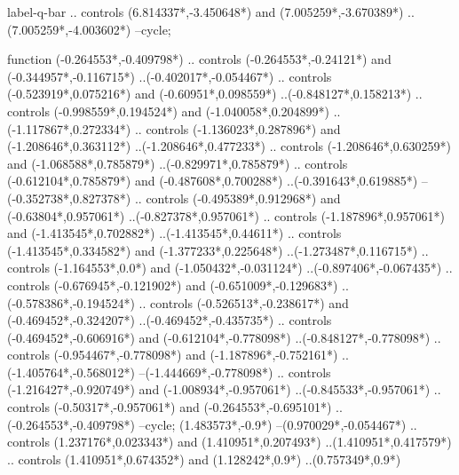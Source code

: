 {\begin{scope}[x=1mm,y=1mm,line width=\SCstroke mm,line cap=round,line join=round]
\begin{SCpart}{label-q-bar}
.. controls ({6.814337*\SCF},{-3.450648*\SCF}) and ({7.005259*\SCF},{-3.670389*\SCF}) ..({7.005259*\SCF},{-4.003602*\SCF})
--cycle;
\end{SCpart}
\begin{SCpart}{function}
 ({-0.264553*\SCF},{-0.409798*\SCF})
.. controls ({-0.264553*\SCF},{-0.24121*\SCF}) and ({-0.344957*\SCF},{-0.116715*\SCF}) ..({-0.402017*\SCF},{-0.054467*\SCF})
.. controls ({-0.523919*\SCF},{0.075216*\SCF}) and ({-0.60951*\SCF},{0.098559*\SCF}) ..({-0.848127*\SCF},{0.158213*\SCF})
.. controls ({-0.998559*\SCF},{0.194524*\SCF}) and ({-1.040058*\SCF},{0.204899*\SCF}) ..({-1.117867*\SCF},{0.272334*\SCF})
.. controls ({-1.136023*\SCF},{0.287896*\SCF}) and ({-1.208646*\SCF},{0.363112*\SCF}) ..({-1.208646*\SCF},{0.477233*\SCF})
.. controls ({-1.208646*\SCF},{0.630259*\SCF}) and ({-1.068588*\SCF},{0.785879*\SCF}) ..({-0.829971*\SCF},{0.785879*\SCF})
.. controls ({-0.612104*\SCF},{0.785879*\SCF}) and ({-0.487608*\SCF},{0.700288*\SCF}) ..({-0.391643*\SCF},{0.619885*\SCF})
--({-0.352738*\SCF},{0.827378*\SCF})
.. controls ({-0.495389*\SCF},{0.912968*\SCF}) and ({-0.63804*\SCF},{0.957061*\SCF}) ..({-0.827378*\SCF},{0.957061*\SCF})
.. controls ({-1.187896*\SCF},{0.957061*\SCF}) and ({-1.413545*\SCF},{0.702882*\SCF}) ..({-1.413545*\SCF},{0.44611*\SCF})
.. controls ({-1.413545*\SCF},{0.334582*\SCF}) and ({-1.377233*\SCF},{0.225648*\SCF}) ..({-1.273487*\SCF},{0.116715*\SCF})
.. controls ({-1.164553*\SCF},{0.0*\SCF}) and ({-1.050432*\SCF},{-0.031124*\SCF}) ..({-0.897406*\SCF},{-0.067435*\SCF})
.. controls ({-0.676945*\SCF},{-0.121902*\SCF}) and ({-0.651009*\SCF},{-0.129683*\SCF}) ..({-0.578386*\SCF},{-0.194524*\SCF})
.. controls ({-0.526513*\SCF},{-0.238617*\SCF}) and ({-0.469452*\SCF},{-0.324207*\SCF}) ..({-0.469452*\SCF},{-0.435735*\SCF})
.. controls ({-0.469452*\SCF},{-0.606916*\SCF}) and ({-0.612104*\SCF},{-0.778098*\SCF}) ..({-0.848127*\SCF},{-0.778098*\SCF})
.. controls ({-0.954467*\SCF},{-0.778098*\SCF}) and ({-1.187896*\SCF},{-0.752161*\SCF}) ..({-1.405764*\SCF},{-0.568012*\SCF})
--({-1.444669*\SCF},{-0.778098*\SCF})
.. controls ({-1.216427*\SCF},{-0.920749*\SCF}) and ({-1.008934*\SCF},{-0.957061*\SCF}) ..({-0.845533*\SCF},{-0.957061*\SCF})
.. controls ({-0.50317*\SCF},{-0.957061*\SCF}) and ({-0.264553*\SCF},{-0.695101*\SCF}) ..({-0.264553*\SCF},{-0.409798*\SCF})
--cycle;
 ({1.483573*\SCF},{-0.9*\SCF})
--({0.970029*\SCF},{-0.054467*\SCF})
.. controls ({1.237176*\SCF},{0.023343*\SCF}) and ({1.410951*\SCF},{0.207493*\SCF}) ..({1.410951*\SCF},{0.417579*\SCF})
.. controls ({1.410951*\SCF},{0.674352*\SCF}) and ({1.128242*\SCF},{0.9*\SCF}) ..({0.757349*\SCF},{0.9*\SCF})

\end{SCpart}
\end{scope}}
